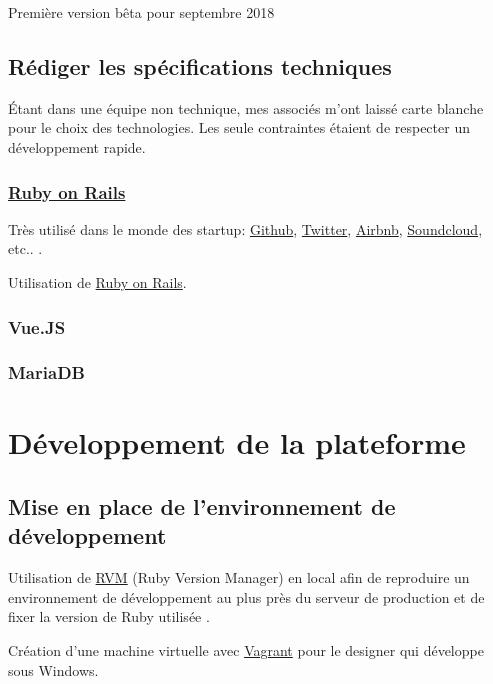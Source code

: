 \documentclass[]{report}
\begin{document}
    Première version bêta pour septembre 2018

  \section{Rédiger les spécifications techniques}

    Étant dans une équipe non technique, mes associés m'ont laissé carte blanche pour le choix des technologies. Les seule contraintes étaient de respecter un développement rapide.

    \subsection{\href{https://rubyonrails.org/}{Ruby on Rails}}

      Très utilisé dans le monde des startup: \href{https://github.com/}{Github}, \href{https://twitter.com/}{Twitter}, \href{https://airbnb.com/}{Airbnb}, \href{https://soundcloud.com/}{Soundcloud}, etc.. .

      Utilisation de \href{https://rubyonrails.org/}{Ruby on Rails}.

    \subsection{Vue.JS}


    \subsection{MariaDB}


\chapter{Développement de la plateforme}

  \section{Mise en place de l'environnement de développement}

    Utilisation de \href{https://rvm.io}{RVM} (Ruby Version Manager) en local afin de reproduire un environnement de développement au plus près du serveur de production et de fixer la version de Ruby utilisée .

    Création d'une machine virtuelle avec \href{https://www.vagrantup.com}{Vagrant} pour le designer qui développe sous Windows.
\end{document}
